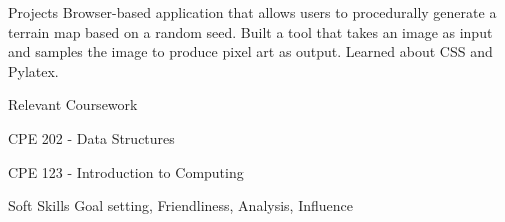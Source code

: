 \documentclass{resume}%
\begin{document}
\begin{flushleft}
\begin{rSection}{Projects}
Browser{-}based application that allows users to procedurally generate a terrain map based on a random seed.%
\linebreak%
\linebreak%
%
\linebreak%
Built a tool that takes an image as input and samples the image to produce pixel art as output. Learned about CSS and Pylatex. %
\end{rSection}%
\begin{rSection}{Relevant Coursework}%
%
\item{CPE 202 {-} Data Structures}%
\item{CPE 123 {-} Introduction to Computing}%
\end{rSection}%
\begin{rSection}{Soft Skills}%
Goal setting, Friendliness, Analysis, Influence%
\end{rSection}%
\end{flushleft}%
\end{document}
